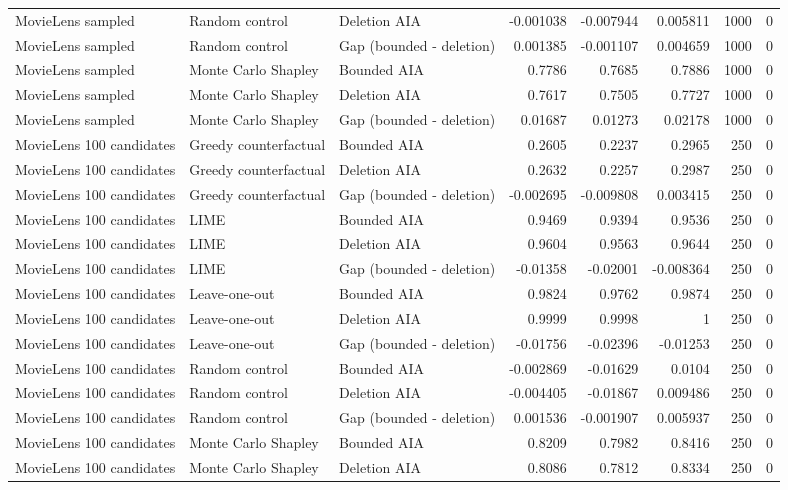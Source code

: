 \begin{table}[t]
{\begin{tabular}{lllrrrrr}
MovieLens sampled & Random control & Deletion AIA & -0.001038 & -0.007944 & 0.005811 & 1000 & 0 \\
MovieLens sampled & Random control & Gap (bounded - deletion) & 0.001385 & -0.001107 & 0.004659 & 1000 & 0 \\
MovieLens sampled & Monte Carlo Shapley & Bounded AIA & 0.7786 & 0.7685 & 0.7886 & 1000 & 0 \\
MovieLens sampled & Monte Carlo Shapley & Deletion AIA & 0.7617 & 0.7505 & 0.7727 & 1000 & 0 \\
MovieLens sampled & Monte Carlo Shapley & Gap (bounded - deletion) & 0.01687 & 0.01273 & 0.02178 & 1000 & 0 \\
MovieLens 100 candidates & Greedy counterfactual & Bounded AIA & 0.2605 & 0.2237 & 0.2965 & 250 & 0 \\
MovieLens 100 candidates & Greedy counterfactual & Deletion AIA & 0.2632 & 0.2257 & 0.2987 & 250 & 0 \\
MovieLens 100 candidates & Greedy counterfactual & Gap (bounded - deletion) & -0.002695 & -0.009808 & 0.003415 & 250 & 0 \\
MovieLens 100 candidates & LIME & Bounded AIA & 0.9469 & 0.9394 & 0.9536 & 250 & 0 \\
MovieLens 100 candidates & LIME & Deletion AIA & 0.9604 & 0.9563 & 0.9644 & 250 & 0 \\
MovieLens 100 candidates & LIME & Gap (bounded - deletion) & -0.01358 & -0.02001 & -0.008364 & 250 & 0 \\
MovieLens 100 candidates & Leave-one-out & Bounded AIA & 0.9824 & 0.9762 & 0.9874 & 250 & 0 \\
MovieLens 100 candidates & Leave-one-out & Deletion AIA & 0.9999 & 0.9998 & 1 & 250 & 0 \\
MovieLens 100 candidates & Leave-one-out & Gap (bounded - deletion) & -0.01756 & -0.02396 & -0.01253 & 250 & 0 \\
MovieLens 100 candidates & Random control & Bounded AIA & -0.002869 & -0.01629 & 0.0104 & 250 & 0 \\
MovieLens 100 candidates & Random control & Deletion AIA & -0.004405 & -0.01867 & 0.009486 & 250 & 0 \\
MovieLens 100 candidates & Random control & Gap (bounded - deletion) & 0.001536 & -0.001907 & 0.005937 & 250 & 0 \\
MovieLens 100 candidates & Monte Carlo Shapley & Bounded AIA & 0.8209 & 0.7982 & 0.8416 & 250 & 0 \\
MovieLens 100 candidates & Monte Carlo Shapley & Deletion AIA & 0.8086 & 0.7812 & 0.8334 & 250 & 0 \\

\end{tabular}}
\end{table}
